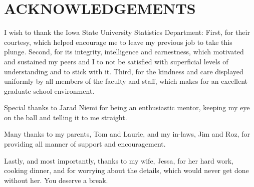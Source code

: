 \chapter*{ACKNOWLEDGEMENTS}

I wish to thank the Iowa State University Statistics Department: First, for their courtesy, which helped encourage me to leave my previous job to take this plunge. Second, for its integrity, intelligence and earnestness, which motivated and sustained my peers and I to not be satisfied with superficial levels of understanding and to stick with it. Third, for the kindness and care displayed uniformly by all members of the faculty and staff, which makes for an excellent graduate school environment.

Special thanks to Jarad Niemi for being an enthusiastic mentor, keeping my eye on the ball and telling it to me straight.

Many thanks to my parents, Tom and Laurie, and my in-laws, Jim and Roz, for providing all manner of support and encouragement.

Lastly, and most importantly, thanks to my wife, Jessa, for her hard work, cooking dinner, and for worrying about the details, which would never get done without her. You deserve a break.
